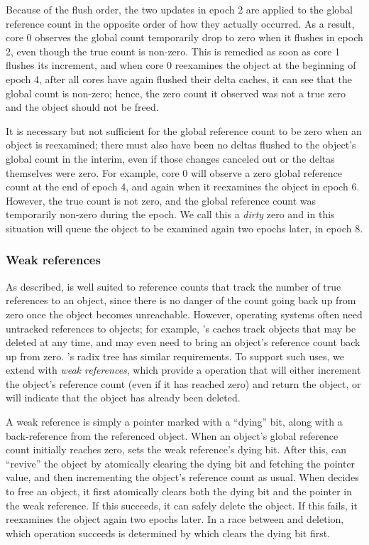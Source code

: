 Because of the flush order, the two updates in epoch 2 are applied to
the global reference count in the opposite order of how they actually
occurred.  As a result, core 0 observes the global count temporarily
drop to zero when it flushes in epoch 2, even though the true count is
non-zero.  This is remedied as soon as core 1 flushes its increment,
and when core 0 reexamines the object at the beginning of epoch 4,
after all cores have again flushed their delta caches, it can see
that the global count is non-zero; hence, the zero count it observed
was not a true zero and the object should not be freed.

It is necessary but not sufficient for the global reference count to
be zero when an object is reexamined; there must also have been no
deltas flushed to the object's global count in the interim, even if
those changes canceled out or the deltas themselves were zero.
%
For example, core 0 will observe a zero global reference count
at the end of epoch 4, and again when it reexamines the object in
epoch 6.  However, the true count is not zero, and the global
reference count was temporarily non-zero during the epoch.  We call
this a \emph{dirty} zero and in this situation  will
queue the object to be examined again two epochs later, in epoch 8.

\subsubsection{Weak references}
As described,  is well suited to reference counts that track
the number of true references to an object, since there is no danger
of the count going back up from zero once the object becomes unreachable.
However, operating systems often need untracked references to objects;
for example, \fs's caches track objects that may be deleted at any time,
and may even need to bring an object's reference count back up from
zero.  \vm's radix tree has similar requirements.  To support such
uses, we extend  with \emph{weak references}, which provide a
 operation that will either increment the object's
reference count (even if it has reached zero) and return the object,
or will indicate that the object has already been deleted.

A weak reference is simply a pointer marked with a ``dying'' bit,
along with a back-reference from the referenced object.  When an
object's global reference count initially reaches zero,  sets
the weak reference's dying bit.  After this,  can
``revive'' the object by atomically clearing the dying bit and
fetching the pointer value, and then incrementing the object's
reference count as usual.  When  decides to free an object,
it first atomically clears both the dying bit and the pointer in the
weak reference.  If this succeeds, it can safely delete the object.
If this fails, it reexamines the object again two epochs later.  In a
race between  and deletion, which operation succeeds is determined
by which clears the dying bit first.

